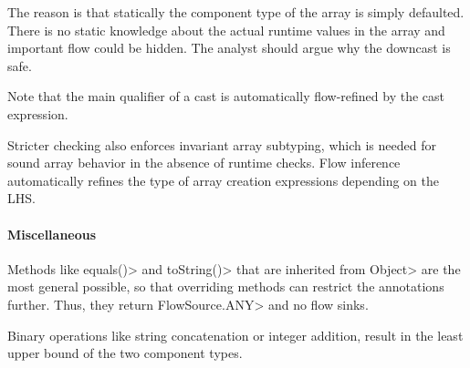 The reason is that statically the component type of the array is
simply defaulted. There is no static knowledge about the actual
runtime values in the array and important flow could be hidden.
The analyst should argue why the downcast is safe.

Note that the main qualifier of a cast is automatically flow-refined
by the cast expression.


\medskip

Stricter checking also enforces invariant array subtyping, which is
needed for sound array behavior in the absence of runtime checks.
Flow inference automatically refines the type of array creation
expressions depending on the LHS.



\paragraph{Miscellaneous}

Methods like \<equals()> and \<toString()> that are inherited from
\<Object> are the most general possible, so that overriding methods
can restrict the annotations further. Thus, they
return \<FlowSource.ANY> and no flow sinks.

Binary operations like string concatenation or integer addition,
result in the least upper bound of the two component types.


